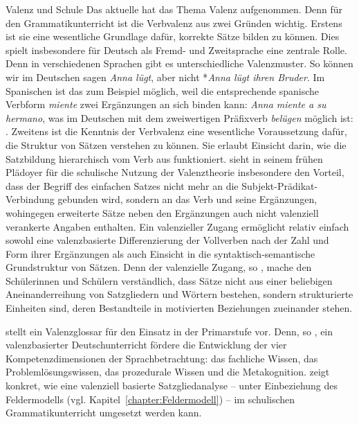 \begin{Exkurs}{Valenz und Schule}
Das aktuelle \citet[30]{KMK2019} hat das Thema Valenz aufgenommen. Denn für den Grammatikunterricht ist die Verbvalenz aus zwei Gründen wichtig. Erstens ist sie eine wesentliche Grundlage dafür, korrekte Sätze bilden zu können. Dies spielt insbesondere für Deutsch als Fremd- und Zweitsprache eine zentrale Rolle. Denn in verschiedenen Sprachen gibt es unterschiedliche Valenzmuster. So können wir im Deutschen sagen \textit{Anna lügt}, aber nicht *\textit{Anna lügt ihren Bruder}. Im Spanischen ist das zum Beispiel möglich, weil die entsprechende spanische Verbform \textit{miente}  zwei Ergänzungen an sich binden kann: \textit{Anna miente a su hermano}, was im Deutschen \zB mit dem zweiwertigen Präfixverb \textit{belügen} möglich ist: . Zweitens ist die Kenntnis der Verbvalenz eine wesentliche Voraussetzung dafür, die Struktur von Sätzen verstehen zu können. Sie erlaubt Einsicht darin, wie die Satzbildung hierarchisch vom Verb aus funktioniert. \citet[114]{Flaemig1971} sieht in seinem frühen Plädoyer für die schulische Nutzung der Valenztheorie insbesondere den Vorteil, dass der Begriff des einfachen Satzes nicht mehr an die Subjekt-Prädikat-Verbindung gebunden wird, sondern an das Verb und seine Ergänzungen, wohingegen erweiterte Sätze neben den Ergänzungen auch nicht valenziell verankerte Angaben enthalten. Ein valenzieller Zugang ermöglicht relativ einfach sowohl eine valenzbasierte Differenzierung der Vollverben nach der Zahl und Form ihrer Ergänzungen als auch Einsicht in die syntaktisch-semantische Grundstruktur von Sätzen. Denn der valenzielle Zugang, so \citet[115]{Flaemig1971}, mache den Schülerinnen und Schülern verständlich, dass Sätze nicht aus einer beliebigen Aneinanderreihung von Satzgliedern und Wörtern bestehen, sondern strukturierte Einheiten sind, deren Bestandteile in motivierten Beziehungen zueinander stehen.  

\citet[122--128]{Peschak2024} stellt ein Valenzglossar für den Einsatz in der Primarstufe vor. Denn, so \citet[116]{Peschak2024}, ein valenzbasierter Deutschunterricht fördere die Entwicklung der vier Kompetenzdimensionen der Sprachbetrachtung: das fachliche Wissen, das Problemlösungswissen, das prozedurale Wissen und die Metakognition. \citet[204--211]{Christ2017} zeigt konkret, wie eine valenziell basierte Satzgliedanalyse -- unter Einbeziehung des Feldermodells (vgl. Kapitel~\ref{chapter:Feldermodell}) -- im schulischen Grammatikunterricht umgesetzt werden kann. 


\end{Exkurs}
